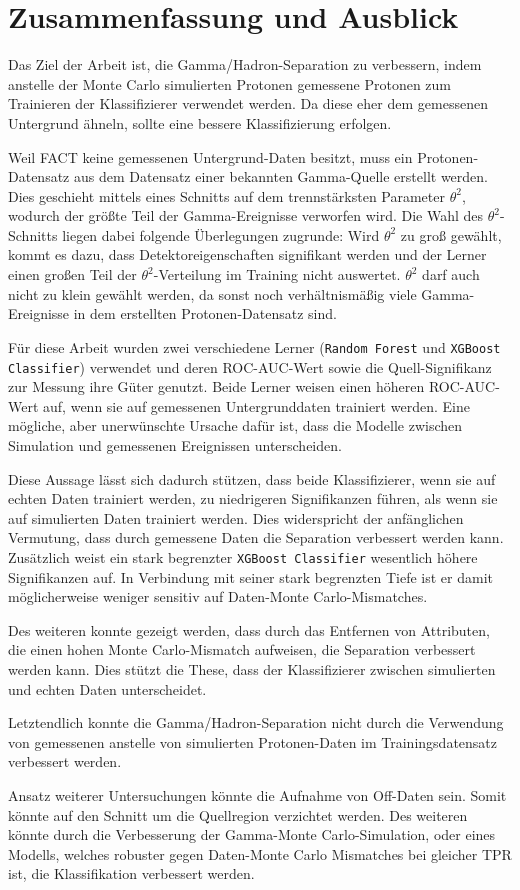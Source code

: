 \chapter{Zusammenfassung und Ausblick}
Das Ziel der Arbeit ist, die Gamma/Hadron-Separation zu verbessern, indem anstelle der Monte Carlo simulierten Protonen gemessene Protonen zum Trainieren der Klassifizierer verwendet werden. 
Da diese eher dem gemessenen Untergrund ähneln, sollte eine bessere Klassifizierung erfolgen.

Weil FACT keine gemessenen Untergrund-Daten besitzt, muss ein Protonen-Datensatz aus dem Datensatz einer bekannten Gamma-Quelle erstellt werden. 
Dies geschieht mittels eines Schnitts auf dem trennstärksten Parameter $\theta^{2}$, wodurch der größte Teil der Gamma-Ereignisse verworfen wird.
Die Wahl des $\theta^{2}$-Schnitts liegen dabei folgende Überlegungen zugrunde:
Wird $\theta^{2}$ zu groß gewählt, kommt es dazu, dass Detektoreigenschaften signifikant werden und der Lerner einen großen Teil der $\theta^{2}$-Verteilung im Training nicht auswertet. 
$\theta^{2}$ darf auch nicht zu klein gewählt werden, da sonst noch verhältnismäßig viele Gamma-Ereignisse in dem erstellten Protonen-Datensatz sind.

Für diese Arbeit wurden zwei verschiedene Lerner (\texttt{Random Forest} und \texttt{XGBoost Classifier}) verwendet und deren ROC-AUC-Wert sowie die Quell-Signifikanz zur Messung ihre Güter genutzt. 
Beide Lerner weisen einen höheren ROC-AUC-Wert auf, wenn sie auf gemessenen Untergrunddaten trainiert werden.
Eine mögliche, aber unerwünschte Ursache dafür ist, dass die Modelle zwischen Simulation und gemessenen Ereignissen unterscheiden.

Diese Aussage lässt sich dadurch stützen, dass beide Klassifizierer, wenn sie auf echten Daten trainiert werden, zu niedrigeren Signifikanzen führen, als wenn sie auf simulierten Daten trainiert werden. 
Dies widerspricht der anfänglichen Vermutung, dass durch gemessene Daten die Separation verbessert werden kann. 
Zusätzlich weist ein stark begrenzter \texttt{XGBoost Classifier} wesentlich höhere Signifikanzen auf. 
In Verbindung mit seiner stark begrenzten Tiefe ist er damit möglicherweise weniger sensitiv auf Daten-Monte Carlo-Mismatches. 

Des weiteren konnte gezeigt werden, dass durch das Entfernen von Attributen, die einen hohen Monte Carlo-Mismatch aufweisen, die Separation verbessert werden kann. 
Dies stützt die These, dass der Klassifizierer zwischen simulierten und echten Daten unterscheidet.

Letztendlich konnte die Gamma/Hadron-Separation nicht durch die Verwendung von gemessenen anstelle von simulierten Protonen-Daten im Trainingsdatensatz verbessert werden. 

Ansatz weiterer Untersuchungen könnte die Aufnahme von Off-Daten sein.
Somit könnte auf den Schnitt um die Quellregion verzichtet werden. 
Des weiteren könnte durch die Verbesserung der Gamma-Monte Carlo-Simulation, oder eines Modells, welches robuster gegen Daten-Monte Carlo Mismatches bei gleicher TPR ist, die Klassifikation verbessert werden.
